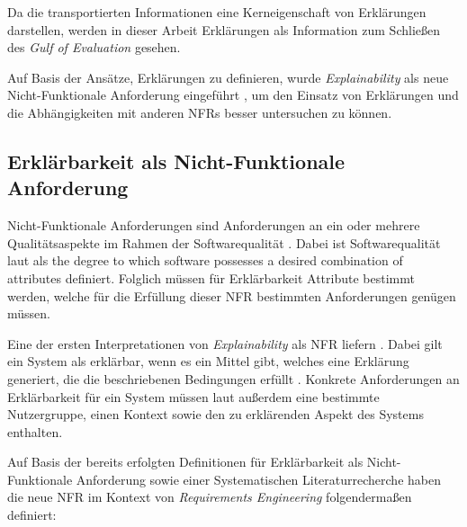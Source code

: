 Da die transportierten Informationen eine Kerneigenschaft von Erklärungen darstellen, werden in dieser Arbeit Erklärungen als Information zum Schließen des \textit{Gulf of Evaluation} \cite{norman1988psychology} gesehen.

Auf Basis der Ansätze, Erklärungen zu definieren, wurde \textit{Explainability} als neue Nicht-Funktionale Anforderung eingeführt \cite{kohl_explainability_2019}, um den Einsatz von Erklärungen und die Abhängigkeiten mit anderen NFRs besser untersuchen zu können.

\subsection{Erklärbarkeit als Nicht-Funktionale Anforderung}
\label{02_basics:explainability}

Nicht-Funktionale Anforderungen sind Anforderungen an ein oder mehrere Qualitätsaspekte im Rahmen der Softwarequalität \cite{chung2009non,schneider2012abenteuer}. Dabei ist Softwarequalität laut  als \glqq [...] the degree to which software possesses a desired combination of attributes\grqq{}\cite{international1992ieee} definiert. Folglich müssen für Erklärbarkeit Attribute bestimmt werden, welche für die Erfüllung dieser NFR bestimmten Anforderungen genügen müssen.

Eine der ersten Interpretationen von \textit{Explainability} als NFR liefern \citeauthor{kohl_explainability_2019}. Dabei gilt ein System als erklärbar, wenn es ein Mittel gibt, welches eine Erklärung generiert, die die beschriebenen Bedingungen erfüllt \cite{kohl_explainability_2019}. Konkrete Anforderungen an Erklärbarkeit für ein System müssen laut \citeauthor{kohl_explainability_2019} außerdem eine bestimmte Nutzergruppe, einen Kontext sowie den zu erklärenden Aspekt des Systems enthalten.

Auf Basis der bereits erfolgten Definitionen für Erklärbarkeit als Nicht-Funktionale Anforderung sowie einer Systematischen Literaturrecherche haben \citeauthor{chazette_knowledge_nodate} die neue NFR im Kontext von \textit{Requirements Engineering} folgendermaßen definiert:

\smallskip

\noindent{}

